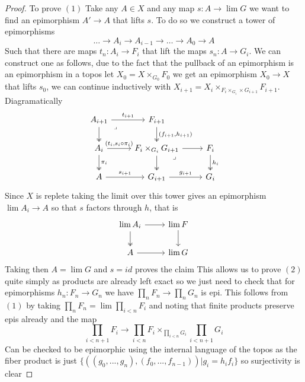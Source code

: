 \documentclass{article}
\begin{document}
\begin{proof}
    To prove $(1)$ Take any $A \in X$ and any map $s\colon A \to \lim G$ we want to find an epimorphism $A' \to A$ that lifts $s$. To do so we construct a tower of epimorphisms \[\dots \to A_i \to A_{i-1} \to \dots \to A_0 \to A\]
    Such that there are maps $t_n\colon A_i \to F_i$ that lift the maps $s_n\colon A \to G_i$. We can construct one as follows, due to the fact that the pullback of an epimorphism is an epimorphism in a topos let $X_0 = X \times_{G_0}F_0$ we get an epimorphism $X_0 \to X$ that lifts $s_0$, we can continue inductively with $X_{i+1}=X_{i} \times_{F_i \times_{G_i} \times G_{i+1}} F_{i+1}$. Diagramatically 
\[\begin{tikzcd}
	{A_{i+1}} & {F_{i+1}} \\
	{A_i} & {F_i \times_{G_i} G_{i+1}} & {F_i} \\
	A & {G_{i+1}} & {G_i}
	\arrow["{t_{i+1}}", from=1-1, to=1-2]
	\arrow[two heads, from=1-1, to=2-1]
	\arrow["\lrcorner"{anchor=center, pos=0.125}, draw=none, from=1-1, to=2-2]
	\arrow["{(f_{i+1},h_{i+1})}", two heads, from=1-2, to=2-2]
	\arrow["{(t_i, s_i \circ\pi_i)}", from=2-1, to=2-2]
	\arrow["{\pi_i}", two heads, from=2-1, to=3-1]
	\arrow[from=2-2, to=2-3]
	\arrow[two heads, from=2-2, to=3-2]
	\arrow["\lrcorner"{anchor=center, pos=0.125}, draw=none, from=2-2, to=3-3]
	\arrow["{h_i}", two heads, from=2-3, to=3-3]
	\arrow["{s_{i+1}}", from=3-1, to=3-2]
	\arrow["{g_{i+1}}", from=3-2, to=3-3]
\end{tikzcd}\]
Since $X$ is replete taking the limit over this tower gives an epimorphism $\lim A_i \to A$ so that $s$ factors through $h$, that is 
\[\begin{tikzcd}
	{\lim A_i} & {\lim F} \\
	A & {\lim G}
	\arrow[from=1-1, to=1-2]
	\arrow[two heads, from=1-1, to=2-1]
	\arrow[from=1-2, to=2-2]
	\arrow[from=2-1, to=2-2]
\end{tikzcd}\]
Taking then $A=\lim G$ and $s=id$ proves the claim
\newline
This allows us to prove $(2)$ quite simply as products are already left exact so we just need to check that for epimorphisms $h_n: F_n \to G_n$ we have $\prod_n F_n \to \prod_n G_n$ is epi. This follows from $(1)$ by taking $\prod_n F_n = \lim \prod_{i < n} F_i$ and noting that finite products preserve epis already and the map \[\prod_{i < n+1} F_i \to \prod_{i < n} F_i \times _{\prod_{i < n}G_i}\prod_{i < n+1}G_i\] Can be checked to be epimorphic using the internal language of the topos as the fiber product is just $\{((g_0,...,g_n),(f_0,...,f_{n-1}))\vert g_i=h_if_i\}$ so surjectivity is clear

\end{proof}
\end{document}
